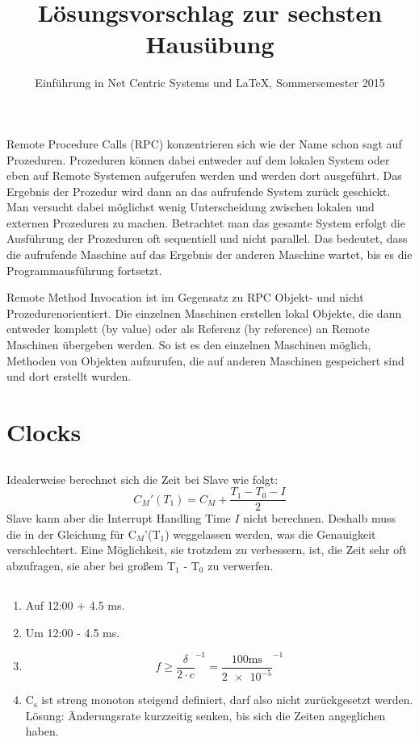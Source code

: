 \documentclass[a4paper,
			llpt,
			solution,
			accentcolor=tud2d,
			colorbacktitle
			]
			{tudexercise}
\title{Lösungsvorschlag zur sechsten Hausübung}
\subtitle{Einführung in Net Centric Systems und \LaTeX, Sommersemester 2015}
\begin{document}
\maketitle
\section{}
Remote Procedure Calls (RPC) konzentrieren sich wie der Name schon sagt auf Prozeduren. Prozeduren können dabei entweder auf dem lokalen System oder eben auf Remote Systemen aufgerufen werden und werden dort ausgeführt. Das Ergebnis der Prozedur wird dann an das aufrufende System zurück geschickt. Man versucht dabei möglichst wenig Unterscheidung zwischen lokalen und externen Prozeduren zu machen. Betrachtet man das gesamte System erfolgt die Ausführung der Prozeduren oft sequentiell und nicht parallel. Das bedeutet, dass die aufrufende Maschine auf das Ergebnis der anderen Maschine wartet, bis es die Programmausführung fortsetzt.

    Remote Method Invocation ist im Gegensatz zu RPC Objekt- und nicht Prozedurenorientiert. Die einzelnen Maschinen erstellen lokal Objekte, die dann entweder komplett (by value) oder als Referenz (by reference) an Remote Maschinen übergeben werden. So ist es den einzelnen Maschinen möglich, Methoden von Objekten aufzurufen, die auf anderen Maschinen gespeichert sind und dort erstellt wurden.
\section{}
\section{Clocks}
\subsection{}
Idealerweise berechnet sich die Zeit bei Slave wie folgt:
$$
C_M'(T_1) = C_M + \frac{T_1-T_0-I}{2}
$$
Slave kann aber die Interrupt Handling Time $I$ nicht berechnen. Deshalb muss die in der Gleichung für C$_M$'(T$_1$) weggelassen werden, was die Genauigkeit verschlechtert. Eine Möglichkeit, sie trotzdem zu verbessern, ist, die Zeit sehr oft abzufragen, sie aber bei großem T$_1$ - T$_0$ zu verwerfen.
\subsection{}
\begin{enumerate}
\item Auf 12:00 + 4.5 ms.
\item Um 12:00 - 4.5 ms.
\item $$f \geq \frac{\delta}{2\cdot c}^{-1} = \frac{100\text{ms}}{\num{2e-5}}^{-1}$$
\item $\text{C}_\text{s}$ ist streng monoton steigend definiert, darf also nicht zurückgesetzt werden. Lösung: Änderungsrate kurzzeitig senken, bis sich die Zeiten angeglichen haben.
\end{enumerate}
\end{document}
